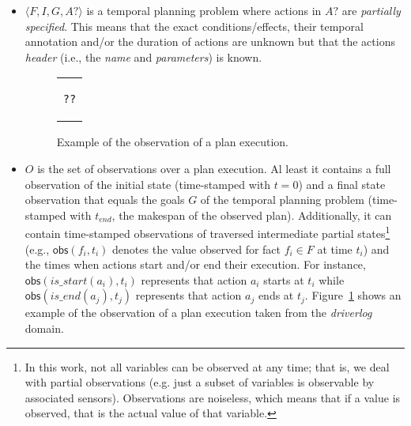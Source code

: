 \documentclass{ecai}
\newcommand{\tup}[1]{{\langle #1 \rangle}}
\newcommand{\obs}{\mathsf{obs}}    %
\begin{document}
\begin{itemize}
\item $\tup{F,I,G,A?}$ is a temporal planning problem where actions in $A?$ are {\em partially specified}. This means that the exact conditions/effects, their temporal annotation and/or the duration of actions are unknown but that the actions {\em header} (i.e., the {\em  name} and {\em parameters}) is known. %

\begin{figure}
\begin{tabular}{p{5cm}}
\begin{scriptsize}    
\begin{verbatim}
??
\end{verbatim}
\end{scriptsize}    
\end{tabular}
\caption{Example of the observation of a plan execution.}
\label{fig:exampleObservations}
\end{figure}  

\item $O$ is the set of observations over a plan execution. Al least it contains a full observation of the initial state (time-stamped with $t=0$) and a final state observation that equals the goals $G$ of the temporal planning problem (time-stamped with $t_{end}$, the makespan of the observed plan). Additionally, it can contain time-stamped observations of traversed intermediate partial states\footnote{In this work, not all variables can be observed at any time; that is, we deal with partial observations (e.g. just a subset of variables is observable by associated sensors). Observations are noiseless, which means that if a value is observed, that is the actual value of that variable.} (e.g., $\obs(f_i,t_i)$ denotes the value observed for fact $f_i \in F$ at time $t_i$) and the times when actions start and/or end their execution. For instance, $\obs(is\_start(a_i),t_i)$  represents that action $a_i$ starts at $t_i$ while $\obs(is\_end(a_j),t_j)$ represents that action $a_j$ ends at $t_j$. Figure~\ref{fig:exampleObservations} shows an example of the observation of a plan execution taken from the {\em driverlog} domain.


\end{itemize}
\end{document}
